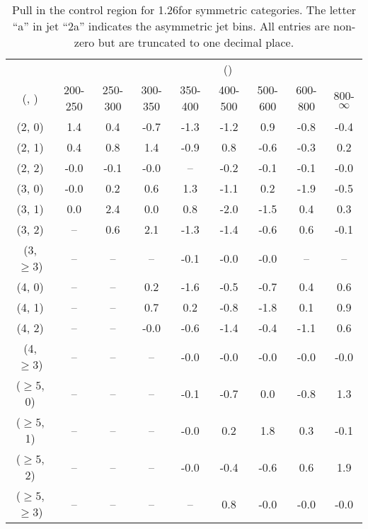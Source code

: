 \begin{table}[h!]
\tiny
\centering
\caption{Pull in the \mmj control region for 1.26\ifb for symmetric categories. The letter ``a'' in jet \eg ``2a''  indicates the asymmetric jet bins. All entries are non-zero but are truncated to one decimal place.\label{tab:pullsep_ewk_mumu_sym}}
\begin{tabular}
{ccccccccc}
	\hline\hline
&	& \multicolumn{8}{c}{\scalht (\gev)} \\ 
	 (\njet,  \nb) & 200-250 & 250-300 & 300-350 & 350-400 & 400-500 & 500-600 & 600-800 & 800-$\infty$ \\ [0.8ex] 
\hline
	(2, 0) & 1.4 & 0.4 & -0.7 & -1.3 & -1.2 & 0.9 & -0.8 & -0.4 \\[0.5ex] 
	(2, 1) & 0.4 & 0.8 & 1.4 & -0.9 & 0.8 & -0.6 & -0.3 & 0.2 \\[0.5ex] 
	(2, 2) & -0.0 & -0.1 & -0.0 & -- & -0.2 & -0.1 & -0.1 & -0.0 \\[0.5ex] 
	(3, 0) & -0.0 & 0.2 & 0.6 & 1.3 & -1.1 & 0.2 & -1.9 & -0.5 \\[0.5ex] 
	(3, 1) & 0.0 & 2.4 & 0.0 & 0.8 & -2.0 & -1.5 & 0.4 & 0.3 \\[0.5ex] 
	(3, 2) & -- & 0.6 & 2.1 & -1.3 & -1.4 & -0.6 & 0.6 & -0.1 \\[0.5ex] 
	(3, $\ge3$) & -- & -- & -- & -0.1 & -0.0 & -0.0 & -- & -- \\[0.5ex] 
	(4, 0) & -- & -- & 0.2 & -1.6 & -0.5 & -0.7 & 0.4 & 0.6 \\[0.5ex] 
	(4, 1) & -- & -- & 0.7 & 0.2 & -0.8 & -1.8 & 0.1 & 0.9 \\[0.5ex] 
	(4, 2) & -- & -- & -0.0 & -0.6 & -1.4 & -0.4 & -1.1 & 0.6 \\[0.5ex] 
	(4, $\ge3$) & -- & -- & -- & -0.0 & -0.0 & -0.0 & -0.0 & -0.0 \\[0.5ex] 
	($\ge5$, 0) & -- & -- & -- & -0.1 & -0.7 & 0.0 & -0.8 & 1.3 \\[0.5ex] 
	($\ge5$, 1) & -- & -- & -- & -0.0 & 0.2 & 1.8 & 0.3 & -0.1 \\[0.5ex] 
	($\ge5$, 2) & -- & -- & -- & -0.0 & -0.4 & -0.6 & 0.6 & 1.9 \\[0.5ex] 
	($\ge5$, $\ge3$) & -- & -- & -- & -- & 0.8 & -0.0 & -0.0 & -0.0 \\[0.5ex] 
	\hline
	\hline
\end{tabular}
\end{table}
